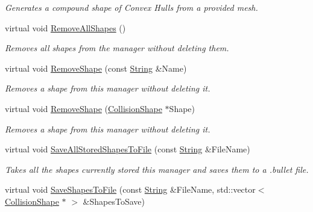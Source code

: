 \begin{DoxyCompactItemize}
\begin{DoxyCompactList}\small\item\em Generates a compound shape of Convex Hulls from a provided mesh. \item\end{DoxyCompactList}\item 
\hypertarget{classphys_1_1CollisionShapeManager_a5d127342831f8154b47898fe0ddf8a00}{
virtual void \hyperlink{classphys_1_1CollisionShapeManager_a5d127342831f8154b47898fe0ddf8a00}{RemoveAllShapes} ()}
\label{classphys_1_1CollisionShapeManager_a5d127342831f8154b47898fe0ddf8a00}

\begin{DoxyCompactList}\small\item\em Removes all shapes from the manager without deleting them. \item\end{DoxyCompactList}\item 
virtual void \hyperlink{classphys_1_1CollisionShapeManager_a71dc6252239eaa132e25a667cd785497}{RemoveShape} (const \hyperlink{namespacephys_aa03900411993de7fbfec4789bc1d392e}{String} \&Name)
\begin{DoxyCompactList}\small\item\em Removes a shape from this manager without deleting it. \item\end{DoxyCompactList}\item 
virtual void \hyperlink{classphys_1_1CollisionShapeManager_a34e1e4c2c0c2000db2f6846a71ec2ad4}{RemoveShape} (\hyperlink{classphys_1_1CollisionShape}{CollisionShape} $\ast$Shape)
\begin{DoxyCompactList}\small\item\em Removes a shape from this manager without deleting it. \item\end{DoxyCompactList}\item 
virtual void \hyperlink{classphys_1_1CollisionShapeManager_a12ead3de459bf95cbb45dc90104fbf5d}{SaveAllStoredShapesToFile} (const \hyperlink{namespacephys_aa03900411993de7fbfec4789bc1d392e}{String} \&FileName)
\begin{DoxyCompactList}\small\item\em Takes all the shapes currently stored this manager and saves them to a .bullet file. \item\end{DoxyCompactList}\item 
virtual void \hyperlink{classphys_1_1CollisionShapeManager_ab69fb14def70c6207f11f3176eda58a4}{SaveShapesToFile} (const \hyperlink{namespacephys_aa03900411993de7fbfec4789bc1d392e}{String} \&FileName, std::vector$<$ \hyperlink{classphys_1_1CollisionShape}{CollisionShape} $\ast$ $>$ \&ShapesToSave)

\end{DoxyCompactItemize}
